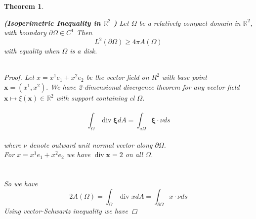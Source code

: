 \documentclass[oneside]{book}
\newtheorem{theorem}{Theorem}[section]
\theoremstyle{definition}
\begin{document}
\begin{theorem}
\label{t:2}

 \textbf{(Isoperimetric Inequality in $\mathbb{R}^{2}$ )} Let $\Omega$ be a relatively compact domain in $\mathbb{R}^{2}$, with boundary $\partial \Omega \in C^{1}$ Then
      \begin{equation}
      \label{eq14}  
   L^{2}(\partial \Omega) \geq 4 \pi A(\Omega) 
      \end{equation}
 with equality when $\Omega$ is a disk.\\\\

\begin{proof}

 Let $x=x^{1} e_{1}+x^{2} e_{2}$ be the vector field on $R^{2}$ with base point $\textbf{x}=\left(x^{1}, x^{2}\right) .$
We have 2-dimensional divergence theorem for any vector
field $\textbf{x} \mapsto \xi(\textbf{x}) \in \mathbb{R}^{2}$ with support containing cl $\Omega$.
\\\\
    \begin{equation}
    \label{eq15}  
\int_{\Omega} \operatorname{div} \boldsymbol{\xi} d A=\int_{a \Omega} \boldsymbol{\xi} \cdot \nu d s 
  \end{equation} \\
  
where $\nu$ denote outward unit normal vector along $\partial\Omega$. \\
    
For  $ x=x^{1} e_{1}+x^{2} e_{2}$ we have 
$\operatorname{div} \textbf{x}=2$ on all $\Omega$. 
\\\\\\
So we have
\\
$$ 2 A(\Omega)=\int_{\Omega} \operatorname{div} x d A=\int_{\partial \Omega} x \cdot \nu d s$$ 
Using vector-Schwartz inequality we have 


\end{proof}
\end{theorem}
\end{document}
